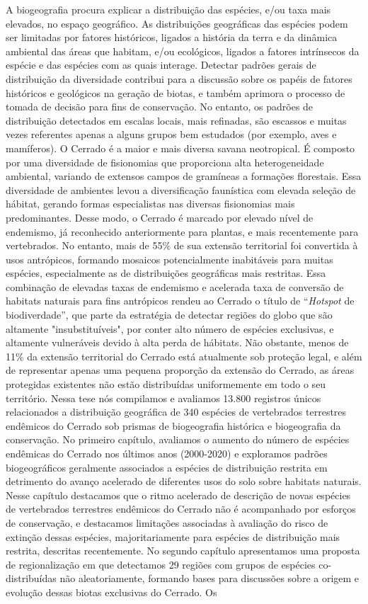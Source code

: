 \documentclass[12pt,openright,oneside,a4paper,english]{abntex2}
\begin{document}
\begin{resumo}[Resumo]
	A biogeografia procura explicar a distribuição das espécies, e/ou taxa mais elevados, no espaço geográfico. As distribuições geográficas das espécies podem ser limitadas por fatores históricos, ligados a história da terra e da dinâmica ambiental das áreas que habitam, e/ou ecológicos, ligados a fatores intrínsecos da espécie e das espécies com as quais interage. Detectar padrões gerais de distribuição da diversidade contribui para a discussão sobre os papéis de fatores históricos e geológicos na geração de biotas, e também aprimora o processo de tomada de decisão para fins de conservação. No entanto, os padrões de distribuição detectados em escalas locais, mais refinadas, são escassos e muitas vezes referentes apenas a alguns grupos bem estudados (por exemplo, aves e mamíferos). O Cerrado é a maior e mais diversa savana neotropical. É composto por uma diversidade de fisionomias que proporciona alta heterogeneidade ambiental, variando de extensos campos de gramíneas a formações florestais. Essa diversidade de ambientes levou a diversificação faunística com elevada seleção de hábitat, gerando formas especialistas nas diversas fisionomias mais predominantes. Desse modo, o Cerrado é marcado por elevado nível de endemismo, já reconhecido anteriormente para plantas, e mais recentemente para vertebrados. No entanto, mais de 55\% de sua extensão territorial foi convertida à usos antrópicos, formando mosaicos potencialmente inabitáveis para muitas espécies, especialmente as de distribuições geográficas mais restritas. Essa combinação de elevadas taxas de endemismo e acelerada taxa de conversão de habitats naturais para fins antrópicos rendeu ao Cerrado o título de “\textit{Hotspot} de biodiverdade”, que parte da estratégia de detectar regiões do globo que são altamente "insubstituíveis", por conter alto número de espécies exclusivas, e altamente vulneráveis devido à alta perda de hábitats. Não obstante, menos de 11\% da extensão territorial do Cerrado está atualmente sob proteção legal, e além de representar apenas uma pequena proporção da extensão do Cerrado, as áreas protegidas existentes não estão distribuídas uniformemente em todo o seu território. Nessa tese nós compilamos e avaliamos 13.800 registros únicos relacionados a distribuição geográfica de 340 espécies de vertebrados terrestres endêmicos do Cerrado sob prismas de biogeografia histórica e biogeografia da conservação. No primeiro capítulo, avaliamos o aumento do número de espécies endêmicas do Cerrado nos últimos anos (2000-2020) e exploramos padrões biogeográficos geralmente associados a espécies de distribuição restrita em detrimento do avanço acelerado de diferentes usos do solo sobre habitats naturais. Nesse capítulo destacamos que o ritmo acelerado de descrição de novas espécies de vertebrados terrestres endêmicos do Cerrado não é acompanhado por esforços de conservação, e destacamos limitações associadas à avaliação do risco de extinção dessas espécies, majoritariamente para espécies de distribuição mais restrita, descritas recentemente. No segundo capítulo apresentamos uma proposta de regionalização em que detectamos 29 regiões com grupos de espécies co-distribuídas não aleatoriamente, formando bases para discussões sobre a origem e evolução dessas biotas exclusivas do Cerrado. Os 
\end{resumo}
\end{document}
